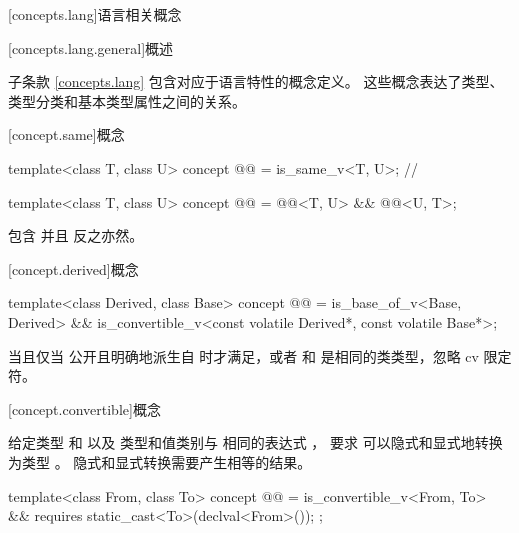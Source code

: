 [concepts.lang]{语言相关概念}

[concepts.lang.general]{概述}

\pnum
子条款 \ref{concepts.lang} 包含对应于语言特性的概念定义。
这些概念表达了类型、类型分类和基本类型属性之间的关系。

[concept.same]{概念 }

\begin{itemdecl}
template<class T, class U>
  concept @@ = is_same_v<T, U>;       // \expos

template<class T, class U>
  concept @@ = @@<T, U> && @@<U, T>;
\end{itemdecl}

\begin{itemdescr}
\pnum
\begin{note}
 包含  并且
反之亦然。
\end{note}
\end{itemdescr}

[concept.derived]{概念 }

\begin{itemdecl}
template<class Derived, class Base>
  concept @@ =
    is_base_of_v<Base, Derived> &&
    is_convertible_v<const volatile Derived*, const volatile Base*>;
\end{itemdecl}

\begin{itemdescr}
\pnum
\begin{note}
 当且仅当
 公开且明确地派生自  时才满足，或者
 和  是相同的类类型，忽略 cv 限定符。
\end{note}
\end{itemdescr}

[concept.convertible]{概念 }

\pnum
给定类型  和  以及
类型和值类别与  相同的表达式 ，
 要求 
可以隐式和显式地转换为类型 。
隐式和显式转换需要产生相等的结果。

\begin{itemdecl}
template<class From, class To>
  concept @@ =
    is_convertible_v<From, To> &&
    requires {
      static_cast<To>(declval<From>());
    };
\end{itemdecl}

